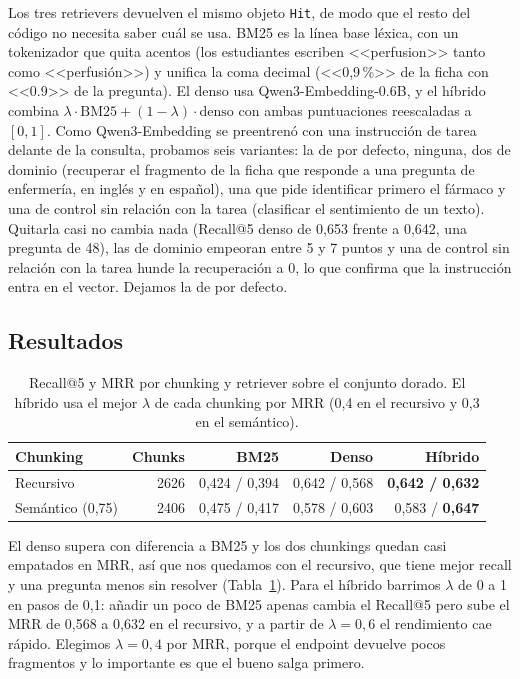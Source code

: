 Los tres retrievers devuelven el mismo objeto \texttt{Hit}, de modo que el resto del código no necesita saber cuál se usa. BM25 es la línea base léxica, con un tokenizador que quita acentos (los estudiantes escriben <<perfusion>> tanto como <<perfusión>>) y unifica la coma decimal (<<0,9\,\%>> de la ficha con <<0.9>> de la pregunta). El denso usa Qwen3-Embedding-0.6B, y el híbrido combina $\lambda \cdot \text{BM25} + (1-\lambda) \cdot \text{denso}$ con ambas puntuaciones reescaladas a $[0, 1]$. Como Qwen3-Embedding se preentrenó con una instrucción de tarea delante de la consulta, probamos seis variantes: la de por defecto, ninguna, dos de dominio (recuperar el fragmento de la ficha que responde a una pregunta de enfermería, en inglés y en español), una que pide identificar primero el fármaco y una de control sin relación con la tarea (clasificar el sentimiento de un texto). Quitarla casi no cambia nada (Recall@5 denso de 0,653 frente a 0,642, una pregunta de 48), las de dominio empeoran entre 5 y 7 puntos y una de control sin relación con la tarea hunde la recuperación a 0, lo que confirma que la instrucción entra en el vector. Dejamos la de por defecto.

\subsection{Resultados}
\begin{table}[H]
    \centering
    \caption{Recall@5 y MRR por chunking y retriever sobre el conjunto dorado. El híbrido usa el mejor $\lambda$ de cada chunking por MRR (0,4 en el recursivo y 0,3 en el semántico).}
    \label{tab:rag}
    \small
    \begin{tabular}{lrrrr}
        \toprule
        Chunking & Chunks & BM25 & Denso & Híbrido \\
        \midrule
        Recursivo       & 2626 & 0,424 / 0,394 & 0,642 / 0,568 & \textbf{0,642 / 0,632} \\
        Semántico (0,75) & 2406 & 0,475 / 0,417 & 0,578 / 0,603 & 0,583 / \textbf{0,647} \\
        \bottomrule
    \end{tabular}
\end{table}

El denso supera con diferencia a BM25 y los dos chunkings quedan casi empatados en MRR, así que nos quedamos con el recursivo, que tiene mejor recall y una pregunta menos sin resolver (Tabla~\ref{tab:rag}). Para el híbrido barrimos $\lambda$ de 0 a 1 en pasos de 0,1: añadir un poco de BM25 apenas cambia el Recall@5 pero sube el MRR de 0,568 a 0,632 en el recursivo, y a partir de $\lambda = 0{,}6$ el rendimiento cae rápido. Elegimos $\lambda = 0{,}4$ por MRR, porque el endpoint devuelve pocos fragmentos y lo importante es que el bueno salga primero.

